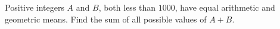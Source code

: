 Positive integers $A$ and $B$, both less than $1000$, have equal arithmetic and geometric means. Find the sum of all possible values of $A+B$.

